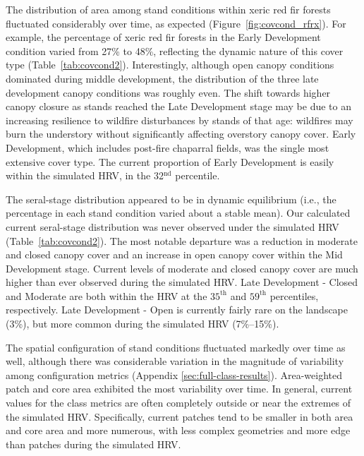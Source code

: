 The distribution of area among stand conditions within xeric red fir forests fluctuated considerably over time, as expected (Figure~\ref{fig:covcond_rfrx}). For example, the percentage of xeric red fir forests in the Early Development condition varied from 27\% to 48\%, reflecting the dynamic nature of this cover type (Table~\ref{tab:covcond2}). Interestingly, although open canopy conditions dominated during middle development, the distribution of the three late development canopy conditions was roughly even. The shift towards higher canopy closure as stands reached the Late Development stage may be due to an increasing resilience to wildfire disturbances by stands of that age: wildfires may burn the understory without significantly affecting overstory canopy cover. Early Development, which includes post-fire chaparral fields, was the single most extensive cover type. The current proportion of Early Development is easily within the simulated HRV, in the 32$^{\text{nd}}$ percentile.

The seral-stage distribution appeared to be in dynamic equilibrium (i.e., the percentage in each stand condition varied about a stable mean). Our calculated current seral-stage distribution was never observed under the simulated HRV (Table~\ref{tab:covcond2}). The most notable departure was a reduction in moderate and closed canopy cover and an increase in open canopy cover within the Mid Development stage. Current levels of moderate and closed canopy cover are much higher than ever observed during the simulated HRV. Late Development - Closed and Moderate are both within the HRV at the $35^{\text{th}}$ and $59^{\text{th}}$ percentiles, respectively. Late Development - Open is currently fairly rare on the landscape (3\%), but more common during the simulated HRV (7\%--15\%). 

The spatial configuration of stand conditions fluctuated markedly over time as well, although there was considerable variation in the magnitude of variability among configuration metrics (Appendix \ref{sec:full-class-results}). Area-weighted patch and core area exhibited the most variability over time. In general, current values for the class metrics are often completely outside or near the extremes of the simulated HRV. Specifically, current patches tend to be smaller in both area and core area and more numerous, with less complex geometries and more edge than patches during the simulated HRV.

